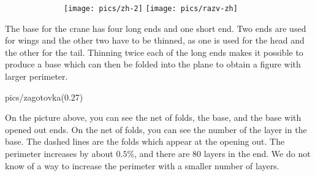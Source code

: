\begin{figure}[h]
\ \ \ \ \ \ \ \ 
\texttt{[image: pics/zh-2]}
\hfill
\texttt{[image: pics/razv-zh]}
\ \ \ \ \ \ \ \ 
\end{figure}



The base for the crane has four long ends and one short end.
Two ends are used for wings and the other two have to be thinned,
as one is used for the head and the other for the tail.
Thinning twice each of the long ends makes it possible to produce a base which can then be folded into the plane to obtain a figure with larger perimeter.
\begin{center}
\begin{lpic}[t(0mm),b(0mm),r(0mm),l(0mm)]{pics/zagotovka(0.27)}
{\large
\lbl{230,170,-10;$\longrightarrow$}
}
{\tiny
{}








}
\end{lpic}
\end{center}
On the picture above, you can see the net of folds, the base, and the base with opened out ends.
On the net of folds, you can see the number of the layer in the base.
The dashed lines are the folds which appear at the opening out. 
The perimeter increases by about $0.5\%$, and there are 80 layers in the end.
We do not know of a way to increase the perimeter with a smaller number of layers.

